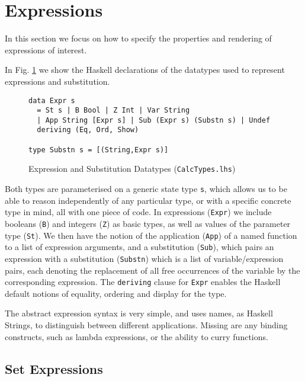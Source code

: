 \section{Expressions}\label{sec:Expressions}

In this section we focus on how to specify the properties and
rendering of expressions of interest.

In Fig. \ref{fig:expr-types} we show the Haskell declarations
of the datatypes used to represent expressions and substitution.
\begin{figure}[tb]
\begin{verbatim}
data Expr s
  = St s | B Bool | Z Int | Var String
  | App String [Expr s] | Sub (Expr s) (Substn s) | Undef
  deriving (Eq, Ord, Show)
  
type Substn s = [(String,Expr s)]
\end{verbatim}
  \caption{Expression and Substitution Datatypes (\texttt{CalcTypes.lhs})}
  \label{fig:expr-types}
\end{figure}
Both types are parameterised on a generic state type \texttt{s},
which allows us to be able to reason independently of any particular type, or with a specific concrete type in mind,
all with one piece of code.
In expressions (\texttt{Expr}) we include booleans (\texttt{B}) and integers (\texttt{Z}) as basic types,
as well as values of the parameter type (\texttt{St}).
We then have the notion of the application (\texttt{App}) of a named function
to a list of expression arguments,
and a substitution (\texttt{Sub}), which pairs an expression
with a substitution (\texttt{Substn}) which is a list of variable/expression pairs, each denoting the replacement of all free
occurrences of the variable by the corresponding expression.
The \texttt{deriving} clause for \texttt{Expr} enables the Haskell default notions
of equality, ordering and display for the type.

The abstract expression syntax is very simple,
and uses names, as Haskell Strings, to distinguish between
different applications.
Missing are any binding constructs, such as lambda expressions,
or the ability to curry functions.

\subsection{Set Expressions}


